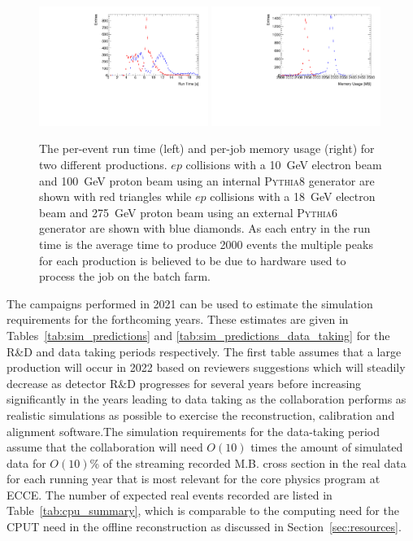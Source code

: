 	\begin{figure}[!htbp]
		\begin{center}
			\includegraphics[width=0.49\textwidth]{figs/simulation_runTime.pdf}
			\includegraphics[width=0.49\textwidth]{figs/simulation_memory.pdf}
		\end{center}
		\caption{\small The per-event run time (left) and per-job memory usage (right) for two different productions. $ep$ collisions with a 10~GeV electron beam and 100~GeV proton beam using an internal \textsc{Pythia8} generator are shown with red triangles while $ep$ collisions with a 18~GeV electron beam and 275~GeV proton beam using an external \textsc{Pythia6} generator are shown with  blue diamonds.  As each entry in the run time is the average time to produce 2000 events the multiple peaks for each production is believed to be due to hardware used to process the job on the batch farm.}\label{fig:sim_jobs}
	\end{figure}

The campaigns performed in 2021 can be used to estimate the simulation requirements for the forthcoming years. These estimates are given in Tables~\ref{tab:sim_predictions} and \ref{tab:sim_predictions_data_taking} for the R\&D and data taking periods respectively. The first table assumes that a large production will occur in 2022 based on reviewers suggestions which will steadily decrease as detector R$\&$D progresses for several years before increasing significantly in the years leading to data taking as the collaboration performs as realistic simulations as possible to exercise the reconstruction, calibration and alignment software.The simulation requirements for the data-taking period assume that the collaboration will need $O(10)$ times the amount of simulated data for $O(10)$\% of the streaming recorded M.B. cross section in the real data for each running year that is most relevant for the core physics program at ECCE. The number of expected real events recorded are listed in Table~\ref{tab:cpu_summary}, which is comparable to the computing need for the CPUT need in the offline reconstruction as discussed in Section~\ref{sec:resources}.

